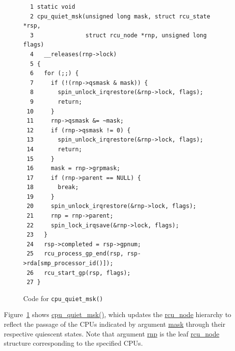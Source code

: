  \QuickQuizEnd

\begin{figure}[tbp]
{ \scriptsize
\begin{verbatim}
  1 static void
  2 cpu_quiet_msk(unsigned long mask, struct rcu_state *rsp,
  3               struct rcu_node *rnp, unsigned long flags)
  4   __releases(rnp->lock)
  5 {
  6   for (;;) {
  7     if (!(rnp->qsmask & mask)) {
  8       spin_unlock_irqrestore(&rnp->lock, flags);
  9       return;
 10     }
 11     rnp->qsmask &= ~mask;
 12     if (rnp->qsmask != 0) {
 13       spin_unlock_irqrestore(&rnp->lock, flags);
 14       return;
 15     }
 16     mask = rnp->grpmask;
 17     if (rnp->parent == NULL) {
 18       break;
 19     }
 20     spin_unlock_irqrestore(&rnp->lock, flags);
 21     rnp = rnp->parent;
 22     spin_lock_irqsave(&rnp->lock, flags);
 23   }
 24   rsp->completed = rsp->gpnum;
 25   rcu_process_gp_end(rsp, rsp->rda[smp_processor_id()]);
 26   rcu_start_gp(rsp, flags);
 27 }
\end{verbatim}
}
\caption{Code for {\tt cpu\_quiet\_msk()}}
\label{fig:app:rcuimpl:rcutreewt:Code for cpu-quiet-msk}
\end{figure}

Figure~\ref{fig:app:rcuimpl:rcutreewt:Code for cpu-quiet-msk}
shows \url{cpu_quiet_msk()}, which updates the \url{rcu_node}
hierarchy to reflect the passage of the CPUs indicated by
argument \url{mask} through their respective quiescent states.
Note that argument \url{rnp} is the leaf \url{rcu_node} structure
corresponding to the specified CPUs.

 \QuickQuizEnd

